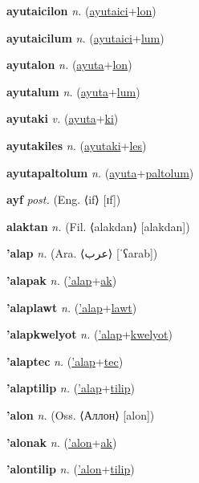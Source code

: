 \textbf{\hypertarget{ayutaicilon}{ayutaicilon}} \textit{n.} (\hyperlink{ayutaici}{ayutaici}+\allowbreak \hyperlink{lon}{lon})


\textbf{\hypertarget{ayutaicilum}{ayutaicilum}} \textit{n.} (\hyperlink{ayutaici}{ayutaici}+\allowbreak \hyperlink{lum}{lum})


\textbf{\hypertarget{ayutalon}{ayutalon}} \textit{n.} (\hyperlink{ayuta}{ayuta}+\allowbreak \hyperlink{lon}{lon})


\textbf{\hypertarget{ayutalum}{ayutalum}} \textit{n.} (\hyperlink{ayuta}{ayuta}+\allowbreak \hyperlink{lum}{lum})


\textbf{\hypertarget{ayutaki}{ayutaki}} \textit{v.} (\hyperlink{ayuta}{ayuta}+\allowbreak \hyperlink{ki}{ki})


\textbf{\hypertarget{ayutakiles}{ayutakiles}} \textit{n.} (\hyperlink{ayutaki}{ayutaki}+\allowbreak \hyperlink{les}{les})


\textbf{\hypertarget{ayutapaltolum}{ayutapaltolum}} \textit{n.} (\hyperlink{ayuta}{ayuta}+\allowbreak \hyperlink{paltolum}{paltolum})


\textbf{\hypertarget{ayf}{ayf}} \textit{post.} (Eng. ⟨if⟩ [ɪf])


\textbf{\hypertarget{alaktan}{alaktan}} \textit{n.} (Fil. ⟨alakdan⟩ [alakdan])


\textbf{\hypertarget{'alap}{'alap}} \textit{n.} (Ara. ⟨{\arabics{}عرب}⟩ [ˈʕarab])


\textbf{\hypertarget{'alapak}{'alapak}} \textit{n.} (\hyperlink{'alap}{'alap}+\allowbreak \hyperlink{ak}{ak})


\textbf{\hypertarget{'alaplawt}{'alaplawt}} \textit{n.} (\hyperlink{'alap}{'alap}+\allowbreak \hyperlink{lawt}{lawt})


\textbf{\hypertarget{'alapkwelyot}{'alapkwelyot}} \textit{n.} (\hyperlink{'alap}{'alap}+\allowbreak \hyperlink{kwelyot}{kwelyot})


\textbf{\hypertarget{'alaptec}{'alaptec}} \textit{n.} (\hyperlink{'alap}{'alap}+\allowbreak \hyperlink{tec}{tec})


\textbf{\hypertarget{'alaptilip}{'alaptilip}} \textit{n.} (\hyperlink{'alap}{'alap}+\allowbreak \hyperlink{tilip}{tilip})


\textbf{\hypertarget{'alon}{'alon}} \textit{n.} (Oss. ⟨Аллон⟩ [alon])


\textbf{\hypertarget{'alonak}{'alonak}} \textit{n.} (\hyperlink{'alon}{'alon}+\allowbreak \hyperlink{ak}{ak})


\textbf{\hypertarget{'alontilip}{'alontilip}} \textit{n.} (\hyperlink{'alon}{'alon}+\allowbreak \hyperlink{tilip}{tilip})


